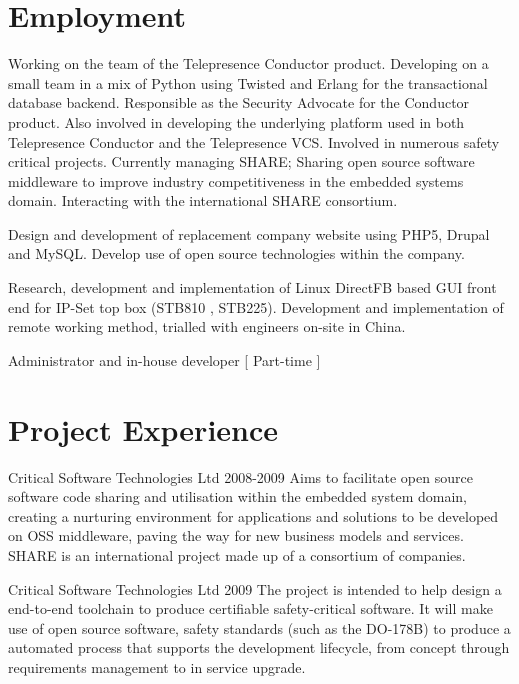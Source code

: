 \documentclass[overlapped,line,letterpaper]{res}
\begin{document}
\begin{resume}
\section{\bf Employment}
{
    Working on the team of the Telepresence Conductor product. Developing
    on a small team in a mix of Python using Twisted and Erlang for the
    transactional database backend.
    Responsible as the Security Advocate for the Conductor product.
    Also involved in developing the underlying platform used in both
    Telepresence Conductor and the Telepresence VCS.
}
{
    Involved in numerous safety critical projects. Currently managing SHARE;
    Sharing open source software middleware to improve industry competitiveness
    in the embedded systems domain. Interacting with the international SHARE
    consortium.
}

{
    Design and development of replacement company website using PHP5, Drupal and
    MySQL.
    Develop use of open source technologies within the company.
}

{
    Research, development and implementation of Linux DirectFB based GUI front end
    for IP-Set top box (STB810 , STB225). Development and implementation of remote
    working method, trialled with engineers on-site in China.
}

{
    Administrator and in-house developer [ Part-time ]
}


\section{\bf Project Experience}
  {Critical Software Technologies Ltd}
  {2008-2009}
{
    Aims to facilitate open source software code sharing and utilisation within
    the embedded system domain, creating a nurturing environment for
    applications and solutions to be developed on OSS middleware, paving the way
    for new business models and services.
    SHARE is an international project made up of a consortium of companies.
}

  {Critical Software Technologies Ltd}
  {2009}
{
    The project is intended to help design a end-to-end toolchain to produce
    certifiable safety-critical software.
    It will make use of open source software, safety standards (such as the
    DO-178B) to produce a automated process that supports the development
    lifecycle, from concept through requirements management to in service
    upgrade.
}


\end{resume}
\end{document}
